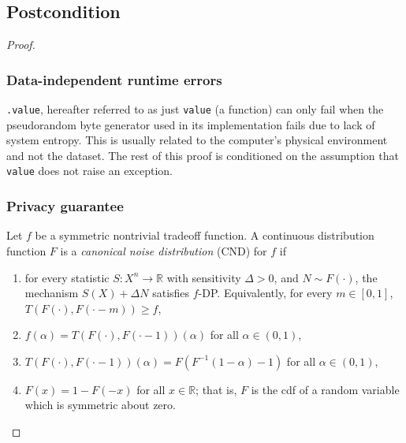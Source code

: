 \documentclass{article}
\begin{document}


\subsection*{Postcondition}

\begin{theorem}
    \label{valid-measurement}
\end{theorem}

\begin{proof}
$ $\newline
\subsubsection*{Data-independent runtime errors}
\texttt{.value}, hereafter referred to as just \texttt{value} (a function) 
can only fail when the pseudorandom byte generator used in its implementation fails due to lack of system entropy. 
This is usually related to the computer's physical environment and not the dataset. 
The rest of this proof is conditioned on the assumption that \texttt{value} does not raise an exception. \\

\subsubsection*{Privacy guarantee}
\begin{definition}
    \label{def2}    
    Let $f$ be a symmetric nontrivial tradeoff function. A {continuous} distribution function $F$ is a \emph{canonical noise distribution} (CND) for $f$ if 
    \begin{enumerate}[(1)]
        \item for every statistic $S: X^n\rightarrow \mathbb{R}$ with sensitivity $\Delta>0$, and $N\sim F(\cdot)$, 
            the mechanism $S(X) + \Delta N$ satisfies $f$-DP. Equivalently, for every $m\in [0,1]$, $T(F(\cdot),F(\cdot-m))\geq f$,
        \item $f(\alpha)=T(F(\cdot),F(\cdot-1))(\alpha)$ for all $\alpha \in (0,1)$,
        \item $T(F(\cdot),F(\cdot-1))(\alpha) = F(F^{-1}(1-\alpha)-1)$ for all $\alpha \in (0,1)$,
        \item $F(x) = 1-F(-x)$ for all $x\in \mathbb{R}$; that is, $F$ is the cdf of a random variable which is symmetric about zero.
    \end{enumerate}
\end{definition}


\end{proof}
\end{document}
